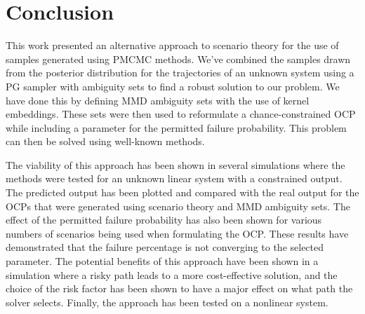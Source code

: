 \chapter{Conclusion} \label{Conclusion}

This work presented an alternative approach to scenario theory for the use of samples generated using PMCMC methods. We've combined the samples drawn from the posterior distribution for the trajectories of an unknown system using a PG sampler with ambiguity sets to find a robust solution to our problem. We have done this by defining MMD ambiguity sets with the use of kernel embeddings. These sets were then used to reformulate a chance-constrained OCP while including a parameter for the permitted failure probability. This problem can then be solved using well-known methods.

The viability of this approach has been shown in several simulations where the methods were tested for an unknown linear system with a constrained output. The predicted output has been plotted and compared with the real output for the OCPs that were generated using scenario theory and MMD ambiguity sets. The effect of the permitted failure probability has also been shown for various numbers of scenarios being used when formulating the OCP. These results have demonstrated that the failure percentage is not converging to the selected parameter. The potential benefits of this approach have been shown in a simulation where a risky path leads to a more cost-effective solution, and the choice of the risk factor has been shown to have a major effect on what path the solver selects. Finally, the approach has been tested on a nonlinear system.




